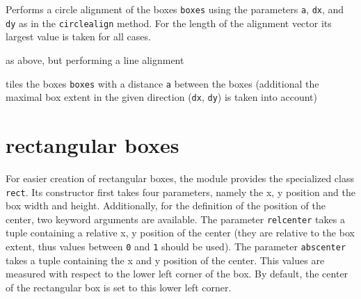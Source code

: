 \begin{description}
\raggedright
\item[\texttt{circlealignequal(boxes, a, dx, dy)}:] Performs a circle
alignment of the boxes \verb|boxes| using the parameters \verb|a|,
\verb|dx|, and \verb|dy| as in the \verb|circlealign| method. For the
length of the alignment vector its largest value is taken for all
cases.
\item[\texttt{linealignequal(boxes, a, dx, dy)}:] as above, but
performing a line alignment
\item[\texttt{tile(boxes, a, dx, dy)}:] tiles the boxes \verb|boxes|
with a distance \verb|a| between the boxes (additional the maximal box
extent in the given direction (\verb|dx|, \verb|dy|) is taken into
account)
\end{description}

\section{rectangular boxes}

For easier creation of rectangular boxes, the module provides the
specialized class \verb|rect|. Its constructor first takes four
parameters, namely the x, y position and the box width and height.
Additionally, for the definition of the position of the center, two
keyword arguments are available. The parameter \verb|relcenter| takes
a tuple containing a relative x, y position of the center (they are
relative to the box extent, thus values between \verb|0| and
\verb|1| should be used). The parameter \verb|abscenter| takes a tuple
containing the x and y position of the center. This values are
measured with respect to the lower left corner of the box. By
default, the center of the rectangular box is set to this lower left
corner.

